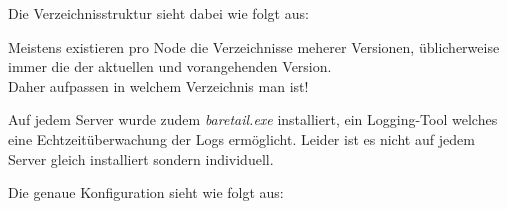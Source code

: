 \begin{flushleft}
    Die Verzeichnisstruktur sieht dabei wie folgt aus:



%


    \begin{mdframed}
    Meistens existieren pro Node die Verzeichnisse meherer Versionen, üblicherweise immer die der aktuellen und vorangehenden Version.\\Daher aufpassen in welchem Verzeichnis man ist!
    \end{mdframed}

    Auf jedem Server wurde zudem \textit{baretail.exe} installiert, ein Logging-Tool welches eine Echtzeitüberwachung der Logs ermöglicht.
    Leider ist es nicht auf jedem Server gleich installiert sondern individuell.

    Die genaue Konfiguration sieht wie folgt aus:
\end{flushleft}
